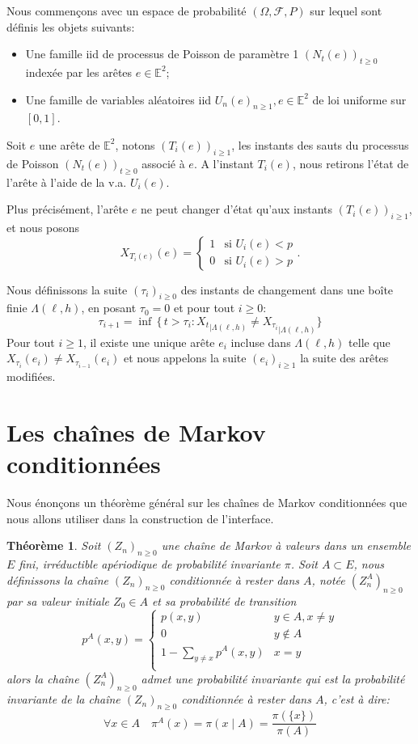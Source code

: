 \documentclass[titlepage,a4paper,12pt]{article}
\newcounter{thm}
\newtheorem{probainv}[thm]{Théorème}
\begin{document}
Nous commençons avec un espace de probabilité $(\Omega, \mathcal{F},P)$ sur lequel sont définis les objets suivants:

\begin{itemize}[label = $\bullet$, leftmargin = *]
\item Une famille iid de processus de Poisson de paramètre 1 $(N_t(e))_{t\geqslant 0}$ indexée par les arêtes $e \in \mathbb{E}^2$;
\item Une famille de variables aléatoires iid $U_n(e)_{n\geqslant 1}, e\in \mathbb{E}^2$ de loi uniforme sur $[0,1]$.
\end{itemize} 


Soit $e$ une arête de $\mathbb{E}^2$, notons $(T_i(e))_{i\geqslant 1}$, les instants des sauts du processus de Poisson $(N_t(e))_{t\geqslant 0}$ associé à $e$. A l'instant $T_i(e)$, nous retirons l'état de l'arête à l'aide de la v.a. $U_i(e)$.

Plus précisément, l'arête $e$ ne peut changer d'état qu'aux instants $(T_i(e))_{i\geqslant 1}$, et nous posons 
$$ X_{T_i(e)}(e) = \left\lbrace \begin{array}{cc}
1 & \text{si }U_i(e) < p \\
0 & \text{si }U_i(e) > p
\end{array}
\right..
$$

Nous définissons la suite $(\tau_i)_{i\geqslant 0}$ des instants de changement dans une boîte finie $\Lambda(\ell,h)$, en posant $\tau_0 = 0$ et pour tout $i\geqslant 0$:
$$\tau_{i+1} = \inf \,\big\{ \, t>\tau_i: {X_t}_{\mid \Lambda(\ell,h)} \neq {X_{\tau_i}}_{\mid \Lambda(\ell,h)} \big \}
$$
Pour tout $i\geqslant 1$, il existe une unique arête $e_i$ incluse dans $\Lambda(\ell,h)$ telle que $X_{\tau_i}(e_i) \neq X_{\tau_{i-1}}(e_i)$ et nous appelons la suite $(e_i)_{i\geqslant 1}$ la suite des arêtes modifiées.

\section{Les chaînes de Markov conditionnées}
Nous énonçons un théorème général sur les chaînes de Markov conditionnées que nous allons utiliser dans la construction de l'interface.

\begin{probainv}
\label{probainv}
Soit $(Z_n)_{n\geqslant 0}$ une chaîne de Markov à valeurs dans un ensemble $E$ fini, irréductible apériodique de probabilité invariante $\pi$. Soit $A\subset E$, nous définissons la chaîne $(Z_n)_{n\geqslant 0}$ conditionnée à rester dans $A$, notée $(Z_n^A)_{n\geqslant 0}$ par sa valeur initiale $Z_0 \in A$ et sa probabilité de transition
$$p^A(x,y)=\left\lbrace \begin{array}{cc}
p(x,y) & y\in A, x\neq y \\
0 & y\notin A \\
1-\sum_{y\neq x}p^A(x,y) & x = y\\
\end{array}
\right.
$$
alors la chaîne $(Z^A_n)_{n\geqslant 0}$ admet une probabilité invariante qui est la probabilité invariante de la chaîne $(Z_n)_{n\geqslant 0}$ conditionnée à rester dans $A$, c'est à dire:
$$\forall x\in A \quad \pi^A(x) = \pi(x\mid A)= \frac{\pi(\{x\})}{\pi(A)}
$$
\end{probainv}
\end{document}
